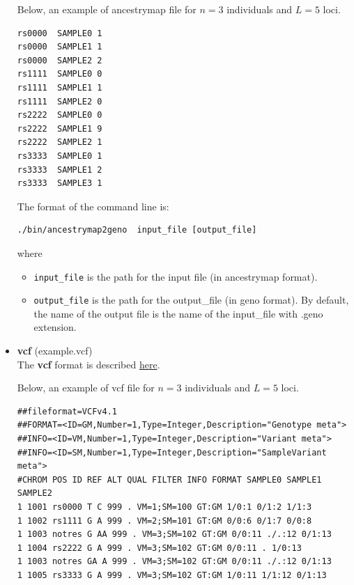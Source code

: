 \documentclass[10pt,a4paper]{article}
\begin{document}
\begin{itemize}
Below, an example of ancestrymap file for $n=3$ individuals and $L=5$ loci.
\begin{center}
\footnotesize
\begin{Verbatim}[frame=single]
rs0000  SAMPLE0 1
rs0000  SAMPLE1 1
rs0000  SAMPLE2 2
rs1111  SAMPLE0 0
rs1111  SAMPLE1 1
rs1111  SAMPLE2 0
rs2222  SAMPLE0 0
rs2222  SAMPLE1 9
rs2222  SAMPLE2 1
rs3333  SAMPLE0 1
rs3333  SAMPLE1 2
rs3333  SAMPLE3 1
\end{Verbatim}
\end{center}

The format of the command line is:
\begin{Verbatim}[frame=single]
./bin/ancestrymap2geno  input_file [output_file]
\end{Verbatim}
where 
\begin{itemize}
\item \verb|input_file| is the path for the input file (in ancestrymap format).
\item \verb|output_file| is the path for the output\_file (in geno format). 
By default, the name of the output file is the name of the input\_file with .geno extension.
\end{itemize}

\item {\bf vcf} (example.vcf)\\
The {\bf vcf} format is described \href{http://www.1000genomes.org/wiki/Analysis/Variant\%20Call\%20Format/vcf-variant-call-format-version-41}{here}.

Below, an example of vcf file for $n=3$ individuals and $L=5$ loci.
\begin{center}
\footnotesize
\begin{Verbatim}[frame=single]
##fileformat=VCFv4.1 
##FORMAT=<ID=GM,Number=1,Type=Integer,Description="Genotype meta"> 
##INFO=<ID=VM,Number=1,Type=Integer,Description="Variant meta"> 
##INFO=<ID=SM,Number=1,Type=Integer,Description="SampleVariant meta"> 
#CHROM POS ID REF ALT QUAL FILTER INFO FORMAT SAMPLE0 SAMPLE1 SAMPLE2 
1 1001 rs0000 T C 999 . VM=1;SM=100 GT:GM 1/0:1 0/1:2 1/1:3 
1 1002 rs1111 G A 999 . VM=2;SM=101 GT:GM 0/0:6 0/1:7 0/0:8 
1 1003 notres G AA 999 . VM=3;SM=102 GT:GM 0/0:11 ./.:12 0/1:13 
1 1004 rs2222 G A 999 . VM=3;SM=102 GT:GM 0/0:11 . 1/0:13
1 1003 notres GA A 999 . VM=3;SM=102 GT:GM 0/0:11 ./.:12 0/1:13 
1 1005 rs3333 G A 999 . VM=3;SM=102 GT:GM 1/0:11 1/1:12 0/1:13 
\end{Verbatim}
\end{center}


\end{itemize}
\end{document}
